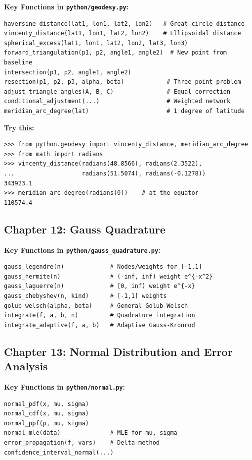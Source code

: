 \documentclass[11pt,a4paper]{article}
\begin{document}
\textbf{Key Functions in \texttt{python/geodesy.py}:}
\begin{lstlisting}[style=python]
haversine_distance(lat1, lon1, lat2, lon2)   # Great-circle distance
vincenty_distance(lat1, lon1, lat2, lon2)    # Ellipsoidal distance
spherical_excess(lat1, lon1, lat2, lon2, lat3, lon3)
forward_triangulation(p1, p2, angle1, angle2)  # New point from baseline
intersection(p1, p2, angle1, angle2)
resection(p1, p2, p3, alpha, beta)            # Three-point problem
adjust_triangle_angles(A, B, C)               # Equal correction
conditional_adjustment(...)                   # Weighted network
meridian_arc_degree(lat)                      # 1 degree of latitude
\end{lstlisting}

\textbf{Try this:}
\begin{lstlisting}[style=python]
>>> from python.geodesy import vincenty_distance, meridian_arc_degree
>>> from math import radians
>>> vincenty_distance(radians(48.8566), radians(2.3522),
...                   radians(51.5074), radians(-0.1278))
343923.1
>>> meridian_arc_degree(radians(0))    # at the equator
110574.4
\end{lstlisting}

\subsection{Chapter 12: Gauss Quadrature}

\textbf{Key Functions in \texttt{python/gauss\_quadrature.py}:}
\begin{lstlisting}[style=python]
gauss_legendre(n)             # Nodes/weights for [-1,1]
gauss_hermite(n)              # (-inf, inf) weight e^{-x^2}
gauss_laguerre(n)             # [0, inf) weight e^{-x}
gauss_chebyshev(n, kind)      # [-1,1] weights
golub_welsch(alpha, beta)     # General Golub-Welsch
integrate(f, a, b, n)         # Quadrature integration
integrate_adaptive(f, a, b)   # Adaptive Gauss-Kronrod
\end{lstlisting}

\subsection{Chapter 13: Normal Distribution and Error Analysis}

\textbf{Key Functions in \texttt{python/normal.py}:}
\begin{lstlisting}[style=python]
normal_pdf(x, mu, sigma)
normal_cdf(x, mu, sigma)
normal_ppf(p, mu, sigma)
normal_mle(data)              # MLE for mu, sigma
error_propagation(f, vars)    # Delta method
confidence_interval_normal(...)
\end{lstlisting}
\end{document}
